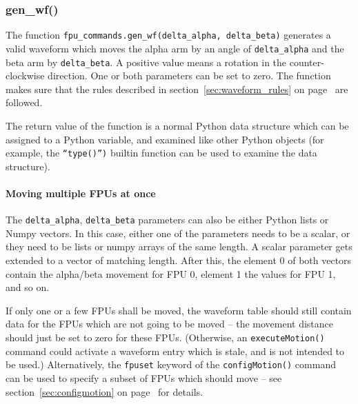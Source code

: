 \documentclass[11pt,a4paper]{scrartcl}
\begin{document}
\subsubsection{gen\_wf()}
\label{sec:genwf}


The function \texttt{fpu\_commands.gen\_wf(delta\_alpha,
  delta\_beta)} generates a valid waveform which moves the alpha arm
by an angle of \texttt{delta\_alpha} and the beta arm by
\texttt{delta\_beta}. A positive value means a rotation in the
counter-clockwise direction.  One or both parameters can be set to
zero. The function makes sure that the rules described in
section~\ref{sec:waveform_rules} on page~\pageref{sec:waveform_rules}
are followed.

The return value of the function is a normal Python data structure
which can be assigned to a Python variable, and examined like other
Python objects (for example, the \texttt{``type()'')} builtin function
can be used to examine the data structure).

\paragraph{Moving multiple FPUs at once}
 The
\verb+delta_alpha+, \verb+delta_beta+ parameters can also be either
Python lists or Numpy vectors. In this case, either one of the
parameters needs to be a scalar, or they need to be lists or numpy
arrays of the same length. A scalar parameter gets extended to a
vector of matching length. After this, the element 0 of both vectors
contain the alpha/beta movement for FPU 0, element 1 the values for
FPU 1, and so on.

If only one or a few FPUs shall be moved, the waveform table should
still contain data for the FPUs which are not going to be moved -- the
movement distance should just be set to zero for these FPUs.
(Otherwise, an \texttt{executeMotion()} command could activate a
waveform entry which is stale, and is not intended to be used.)
Alternatively, the \texttt{fpuset} keyword of the
\texttt{configMotion()} command can be used to specify a subset of FPUs
which should move -- see section~\ref{sec:configmotion} on
page~\pageref{sec:configmotion} for details.
\end{document}
